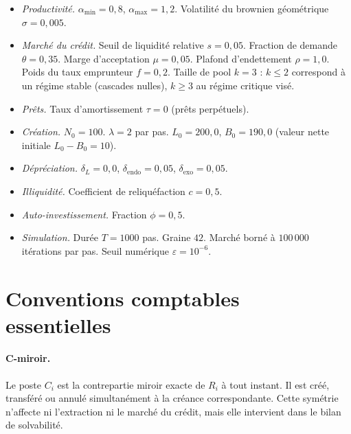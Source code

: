\documentclass[11pt,a4paper]{article}
\begin{document}
\begin{itemize}
    \item \emph{Productivité.} \(\alpha_{\min}=0{,}8\), \(\alpha_{\max}=1{,}2\). Volatilité du brownien géométrique \(\sigma = 0{,}005\).

    \item \emph{Marché du crédit.} Seuil de liquidité relative \(s=0{,}05\). Fraction de demande \(\theta=0{,}35\). Marge d'acceptation \(\mu=0{,}05\). Plafond d'endettement \(\rho=1{,}0\). Poids du taux emprunteur \(f=0{,}2\). Taille de pool \(k=3\) : \(k\le 2\) correspond à un régime stable (cascades nulles), \(k\ge 3\) au régime critique visé.

    \item \emph{Prêts.} Taux d'amortissement \(\tau=0\) (prêts perpétuels).

    \item \emph{Création.} \(N_0 = 100\). \(\lambda = 2\) par pas. \(L_0 = 200{,}0\), \(B_0 = 190{,}0\) (valeur nette initiale \(L_0-B_0 = 10\)).

    \item \emph{Dépréciation.} \(\delta_L = 0{,}0\), \(\delta_{\mathrm{endo}} = 0{,}05\), \(\delta_{\mathrm{exo}} = 0{,}05\).

    \item \emph{Illiquidité.} Coefficient de reliquéfaction \(c = 0{,}5\).

    \item \emph{Auto-investissement.} Fraction \(\phi = 0{,}5\).

    \item \emph{Simulation.} Durée \(T=1000\) pas. Graine \(42\). Marché borné à \(100\,000\) itérations par pas. Seuil numérique \(\varepsilon=10^{-6}\).
\end{itemize}

\section{Conventions comptables essentielles}

\paragraph{C-miroir.} Le poste \(C_i\) est la contrepartie miroir exacte de \(R_i\) à tout instant. Il est créé, transféré ou annulé simultanément à la créance correspondante. Cette symétrie n'affecte ni l'extraction ni le marché du crédit, mais elle intervient dans le bilan de solvabilité.
\end{document}
